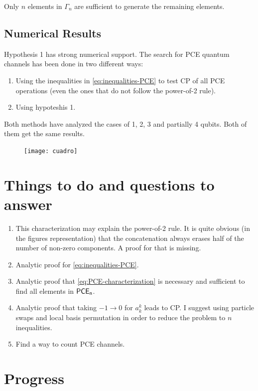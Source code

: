\begin{conj}
Only $n$ elements in $\Gamma_n$ are sufficient to generate the 
remaining elements.
\end{conj}
\subsection{Numerical Results} %
Hypothesis 1 has strong numerical support. The search for PCE quantum
channels has been done in two different ways:
\begin{enumerate}
\item Using the inequalities in \eqref{eq:inequalities-PCE} to test CP of 
all PCE operations (even the ones that do not follow the power-of-2 rule).
\item Using hypoteshis 1.
\end{enumerate}
Both methods have analyzed the cases of 1, 2, 3 and partially 4 qubits. 
Both of them get the same results. 

\begin{figure}[H]
  \centering
  \texttt{[image: cuadro]}
\end{figure}
\section{Things to do and questions to answer} %
\begin{enumerate}
\item This characterization may explain the power-of-2 rule. 
It is quite obvious (in the figures representation) that the concatenation
always erases half of the number of non-zero components. A proof 
for that is missing.
\item Analytic proof for \eqref{eq:inequalities-PCE}. 
\item Analytic proof that \eqref{eq:PCE-characterization} is necessary 
and sufficient to find all elements in $\mathsf{PCE}_\mathsf{n}$.
\item Analytic proof that taking $-1\to 0$ for $a_k^k$ leads to CP.
I suggest using particle swaps and local basis permutation in order 
to reduce the problem to $n$ inequalities.
\item Find a way to count PCE channels.
\end{enumerate}

\section{Progress}

